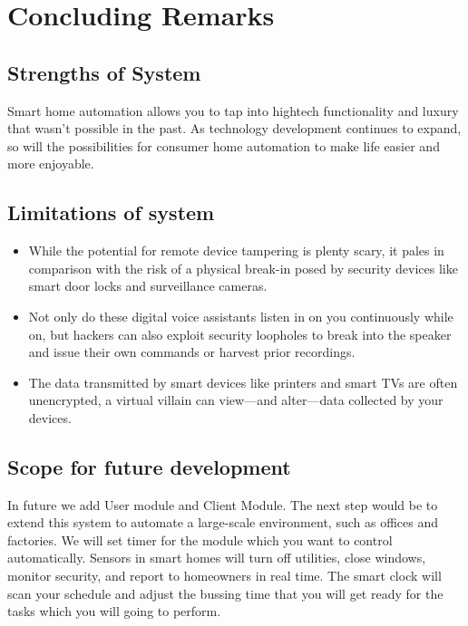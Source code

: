 \chapter{Concluding Remarks}


\section{Strengths of System}

Smart home automation allows you to tap into hightech functionality and luxury that wasn’t possible in the past. As technology development continues to expand, so will the possibilities for consumer home automation to make life easier and more enjoyable.





\section{Limitations of system}

\begin{itemize}
\item  While the potential for remote device tampering is plenty scary, it pales in comparison with the risk of a physical break-in posed by security devices like
smart door locks and surveillance cameras.
\item  Not only do these digital voice assistants listen in on you continuously while on, but hackers can also exploit security loopholes to break into the speaker and issue their own commands or harvest prior recordings.
\item  The data transmitted by smart devices like printers and smart TVs are often unencrypted, a virtual villain can view—and alter—data collected by your devices.


\end{itemize}

\section{Scope for future development} 

In future we add User module and Client Module.
The next step would be to extend this system to automate a large-scale environment, such as offices and factories.
We will set timer for the module which you want to control automatically.
Sensors in smart homes will turn off utilities, close windows, monitor security,
and report to homeowners in real time.
The smart clock will scan your schedule and adjust the bussing time that you
will get ready for the tasks which you will going to perform.


